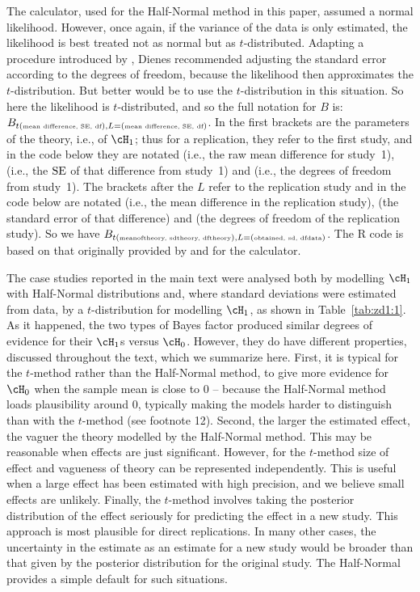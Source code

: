 The  calculator, used for the Half-Normal method in this paper, assumed a normal likelihood. However, once again, if the variance of the data is only estimated, the likelihood is best treated not as normal but as $t$-distributed. Adapting a procedure introduced by , Dienes recommended adjusting the standard error according to the degrees of freedom, because the likelihood then approximates the $t$-distribution. But better would be to use the $t$-distribution in this situation. So here the likelihood is $t$-distributed, and so the full notation for $B$ is: $B_{t(\tiny\mbox{mean difference, SE, df}), L = (\mbox{mean difference, SE, df})}$.   In the first brackets are the parameters of the theory, i.e., of $\cH_1$; thus for a replication, they refer to the first study, and in the code below they are notated   (i.e., the raw mean difference for study~1),  (i.e., the $\mbox{SE}$ of that difference from study~1) and  (i.e., the degrees of freedom from study~1). The brackets after the $L$ refer to the replication study and in the code below are notated  (i.e., the mean difference in the replication study),  (the standard error of that difference) and  (the degrees of freedom of the replication study). So we have $B_{t(\mbox{\tiny meanoftheory, sdtheory, dftheory}), L = (\mbox{\tiny obtained, sd, dfdata})}$.  The R code is based on that originally provided by  and for the  calculator.

The case studies reported in the main text were analysed both by modelling $\cH_1$ with Half-Normal distributions and, where standard deviations were estimated from data, by a $t$-distribution for modelling $\cH_1$, as shown in Table~\ref{tab:zd1:1}. As it happened, the two types of Bayes factor produced similar degrees of evidence for their $\cH_1$s versus $\cH_0$. However, they do have different properties, discussed throughout the text, which we summarize here. First, it is typical for the $t$-method rather than the Half-Normal method, to give more evidence for $\cH_0$ when the sample mean is close to 0 -- because the Half-Normal method loads plausibility around 0, typically making the models harder to distinguish than with the $t$-method (see footnote 12).  Second, the larger the estimated effect, the vaguer the theory modelled by the Half-Normal method. This may be reasonable when effects are just significant. However, for the $t$-method size of effect and vagueness of theory can be represented independently. This is useful when a large effect has been estimated with high precision, and we believe small effects are unlikely.  Finally, the $t$-method involves taking the posterior distribution of the effect seriously for predicting the effect in a new study.  This approach is most plausible for direct replications. In many other cases, the uncertainty in the estimate as an estimate for a new study would be broader than that given by the posterior distribution for the original study.  The Half-Normal provides a simple default for such situations.




